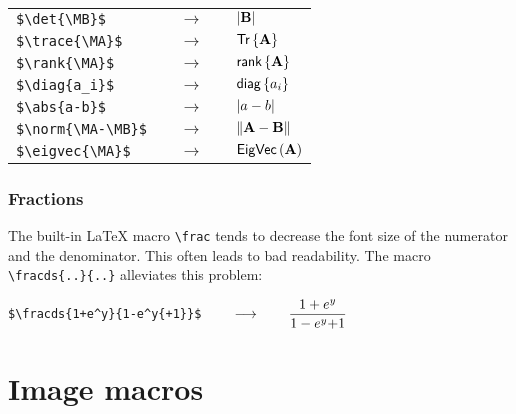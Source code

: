 \documentclass{article}
\begin{document}
\begin{table}[h]
\begin{tabular}{lll}
\verb"$\det{\MB}$"              & $\quad \longrightarrow \quad$ & $\left| {\mathbf{B}} \right|$              \\
\verb"$\trace{\MA}$"              & $\quad \longrightarrow \quad$ & $\mbox{\sf Tr} \left\{ \mathbf{A} \right\}$              \\
\verb"$\rank{\MA}$"              & $\quad \longrightarrow \quad$ & $\mbox{\sf rank}\left\{ \mathbf{A} \right\}$              \\
\verb"$\diag{a_i}$"              & $\quad \longrightarrow \quad$ & $\mbox{\sf diag}\left\{ a_i \right\}$              \\
\verb"$\abs{a-b}$"              & $\quad \longrightarrow \quad$ & $\left| {a-b} \right|$              \\
\verb"$\norm{\MA-\MB}$"              & $\quad \longrightarrow \quad$ & $\left\| {\mathbf{A}-\mathbf{B}} \right\|$              \\
\verb"$\eigvec{\MA}$"              & $\quad \longrightarrow \quad$ & $\mbox{\sf EigVec}\left( \mathbf{A} \right)$          
\end{tabular}
\end{table}

%
%
%

%
%
%
%

%
%
%






\subsubsection{Fractions}

The built-in LaTeX macro \verb"\frac" tends to decrease the font size
of the numerator and the denominator. This often leads to bad readability.
The macro \verb"\fracds{..}{..}" alleviates this problem:

\verb"$\fracds{1+e^y}{1-e^y{+1}}$" $\qquad \longrightarrow \qquad {\displaystyle \frac{1+e^y}{1-e^y{+1}}}$

\clearpage

\section{Image macros}
\end{document}
